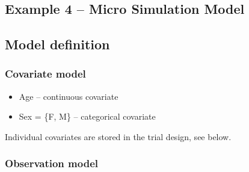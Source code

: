 \subsection{Example 4 -- Micro Simulation Model}
\label{subsec:exp4}

\subsection*{Model definition}

\subsubsection*{Covariate model}
\begin{itemize}
\item
Age -- continuous covariate
\item
Sex = \{F, M\} -- categorical covariate
\end{itemize}
Individual covariates are stored in the trial design, see below.

\subsubsection*{Observation model}

